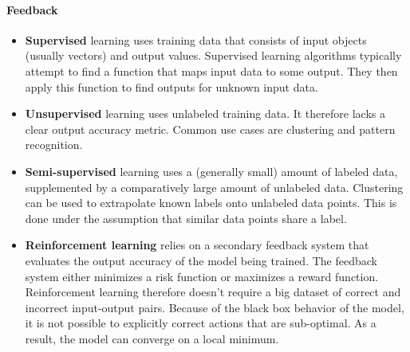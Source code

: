 \paragraph{Feedback}
\begin{itemize}
	\item \textbf{Supervised}
		learning uses training data that consists of input objects (usually vectors) and output values. Supervised learning algorithms typically attempt to find a function that maps input data to some output. They then apply this function to find outputs for unknown input data.
	\item \textbf{Unsupervised}
		learning uses unlabeled training data. It therefore lacks a clear output accuracy metric. Common use cases are clustering and pattern recognition.
	\item \textbf{Semi-supervised}
		learning uses a (generally small) amount of labeled data, supplemented by a comparatively large amount of unlabeled data. Clustering can be used to extrapolate known labels onto unlabeled data points. This is done under the assumption that similar data points share a label.
	\item \textbf{Reinforcement learning}
		relies on a secondary feedback system that evaluates the output accuracy of the model being trained. The feedback system either minimizes a risk function or maximizes a reward function. Reinforcement learning therefore doesn't require a big dataset of correct and incorrect input-output pairs. Because of the black box behavior of the model, it is not possible to explicitly correct actions that are sub-optimal. As a result, the model can converge on a local minimum.
\end{itemize}

